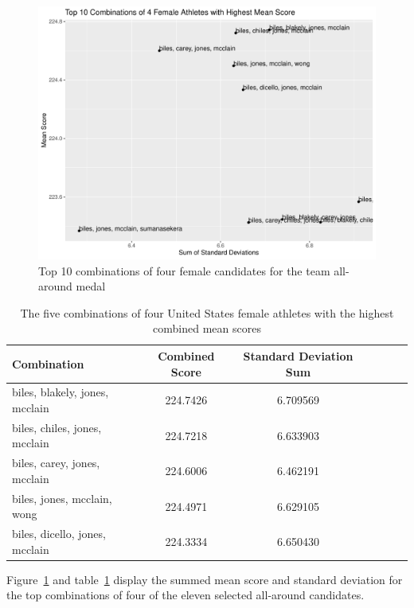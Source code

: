 \documentclass[12pt]{article}
\begin{document}
\begin{figure}
  \centering
  \includegraphics[scale=0.6]{FemaleAthletesAA4.pdf}
  \caption{Top 10 combinations of four female candidates for the team all-around medal}
  \label{fig:AA4}
\end{figure}

\begin{table}
  \caption{The five combinations of four United States female athletes with the highest combined mean scores}
  \label{tab:tableAA4}
\centering
\begin{tabular}[t]{lccllll}
 \toprule
Combination & Combined Score & Standard Deviation Sum\\
\midrule
biles, blakely, jones, mcclain & 224.7426 & 6.709569\\
\midrule
biles, chiles, jones, mcclain & 224.7218 & 6.633903\\
\midrule
biles, carey, jones, mcclain & 224.6006 & 6.462191\\
\midrule
biles, jones, mcclain, wong & 224.4971 & 6.629105\\
\midrule
biles, dicello, jones, mcclain & 224.3334 & 6.650430\\
\bottomrule
\end{tabular}
\end{table} 

Figure~\ref{fig:AA4} and table~\ref{tab:tableAA4} display the summed mean score and standard deviation 
for the top combinations of four of the eleven selected all-around candidates.
\end{document}
